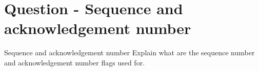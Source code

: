 \section{Question - Sequence and acknowledgement number}

\begin{questionBox}{Sequence and acknowledgement number}
    Explain what are the sequence number and acknowledgement number flags used for.
\end{questionBox}
